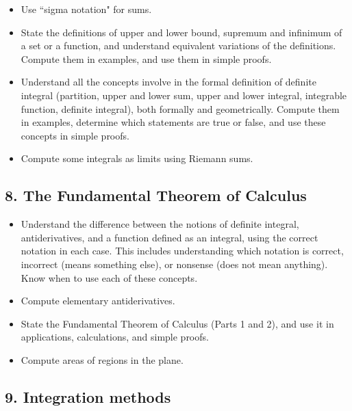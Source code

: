 \documentclass[11pt]{article}
\begin{document}
	\begin{itemize}
		\item Use ``sigma notation" for sums.

		\item State the definitions of upper and lower bound, supremum and infinimum
			of a set or a function, and understand equivalent variations of the definitions.
			Compute them in examples, and use them in simple proofs.

		\item Understand all the concepts involve in the formal definition of definite
			integral (partition, upper and lower sum, upper and lower integral, integrable
			function, definite integral), both formally and geometrically. Compute them
			in examples, determine which statements are true or false, and use these concepts
			in simple proofs.

		\item Compute some integrals as limits using Riemann sums.
	\end{itemize}

	\subsection{8. The Fundamental Theorem of Calculus}

	\begin{itemize}
		\item Understand the difference between the notions of definite integral,
			antiderivatives, and a function defined as an integral, using the correct
			notation in each case. This includes understanding which notation is correct,
			incorrect (means something else), or nonsense (does not mean anything).
			Know when to use each of these concepts.

		\item Compute elementary antiderivatives.

		\item State the Fundamental Theorem of Calculus (Parts 1 and 2), and use it
			in applications, calculations, and simple proofs.

		\item Compute areas of regions in the plane.
	\end{itemize}

	\subsection{9. Integration methods}
\end{document}
